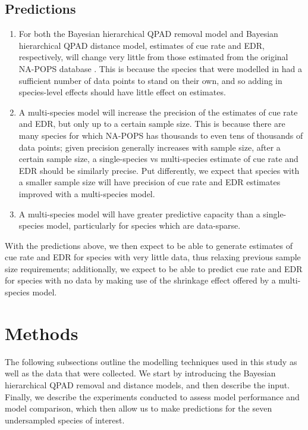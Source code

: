 \documentclass[12pt]{article}
\begin{document}
\subsection{Predictions}
\begin{enumerate}
	\item\label{pred1} For both the Bayesian hierarchical QPAD removal model and Bayesian hierarchical QPAD distance model, estimates of cue rate and EDR, respectively, will change very little from those estimated from the original NA-POPS database \cite{edwards_point_2023}. 
	This is because the species that were modelled in \citet{edwards_point_2023} had a sufficient number of data points to stand on their own, and so adding in species-level effects should have little effect on estimates. 
	\item\label{pred2} A multi-species model will increase the precision of the estimates of cue rate and EDR, but only up to a certain sample size. 
	This is because there are many species for which NA-POPS has thousands to even tens of thousands of data points; given precision generally increases with sample size, after a certain sample size, a single-species vs multi-species estimate of cue rate and EDR should be similarly precise. 
	Put differently, we expect that species with a smaller sample size will have precision of cue rate and EDR estimates improved with a multi-species model.
	\item\label{pred3} A multi-species model will have greater predictive capacity than a single-species model, particularly for species which are data-sparse.
\end{enumerate}

\par With the predictions above, we then expect to be able to generate estimates of cue rate and EDR for species with very little data, thus relaxing previous sample size requirements; additionally, we expect to be able to predict cue rate and EDR for species with no data by making use of the shrinkage effect offered by a multi-species model.

\section{Methods}

\par The following subsections outline the modelling techniques used in this study as well as the data that were collected. 
We start by introducing the Bayesian hierarchical QPAD removal and distance models, and then describe the input.
Finally, we describe the experiments conducted to assess model performance and model comparison, which then allow us to make predictions for the seven undersampled species of interest.
\end{document}
